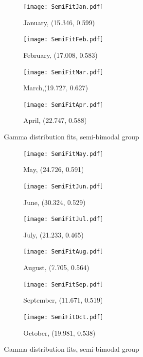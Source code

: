 \documentclass{article}
\begin{document}
	\begin{figure}[H]
		\ContinuedFloat*
		\centering
		\begin{subfigure}{0.5\textwidth}
			\centering
			\texttt{[image: SemiFitJan.pdf]}
			\caption{January, (15.346, 0.599)}
		\end{subfigure}%
		\begin{subfigure}{0.5\textwidth}
			\centering
			\texttt{[image: SemiFitFeb.pdf]}
			\caption{February, (17.008, 0.583)}
		\end{subfigure}
		\begin{subfigure}{0.5\textwidth}
			\centering
			\texttt{[image: SemiFitMar.pdf]}
			\caption{March,(19.727, 0.627)}
		\end{subfigure}%
		\begin{subfigure}{0.5\textwidth}
			\centering
			\texttt{[image: SemiFitApr.pdf]}
			\caption{April, (22.747, 0.588)}
		\end{subfigure}
	\caption{Gamma distribution fits, semi-bimodal group}
	\label{GammaFitSemi}
	\end{figure}
	\begin{figure}[H]
		\ContinuedFloat
		\centering
		\begin{subfigure}{0.5\textwidth}
			\centering
			\texttt{[image: SemiFitMay.pdf]}
			\caption{May, (24.726, 0.591)}
		\end{subfigure}%
		\begin{subfigure}{0.5\textwidth}
			\centering
			\texttt{[image: SemiFitJun.pdf]}
			\caption{June, (30.324, 0.529)}
		\end{subfigure}
		\begin{subfigure}{0.5\textwidth}
			\centering
			\texttt{[image: SemiFitJul.pdf]}
			\caption{July, (21.233, 0.465)}
		\end{subfigure}%
		\begin{subfigure}{0.5\textwidth}
			\centering
			\texttt{[image: SemiFitAug.pdf]}
			\caption{August, (7.705, 0.564)}
		\end{subfigure}
		\begin{subfigure}{0.5\textwidth}
			\centering
			\texttt{[image: SemiFitSep.pdf]}
			\caption{September, (11.671, 0.519)}
		\end{subfigure}%
		\begin{subfigure}{0.5\textwidth}
			\centering
			\texttt{[image: SemiFitOct.pdf]}
			\caption{October, (19.981, 0.538)}
		\end{subfigure}
		\caption{Gamma distribution fits, semi-bimodal group}
	\end{figure}
\end{document}
